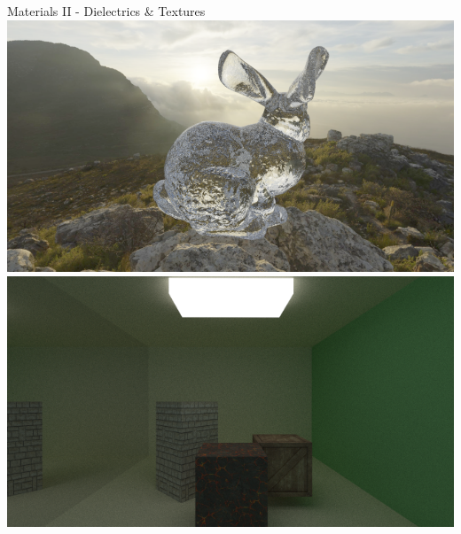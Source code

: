 \documentclass[xcolor=table]{beamer}
\begin{document}
\begin{frame}{Materials II - Dielectrics \& Textures}
   {
   \centering
   	\includegraphics[scale=0.185]{media/CapeHill_cristal_bunny_2.png}
   }
   {
   	\includegraphics[scale=0.25]{media/cornell_textures.png}
   }

\end{frame}
\end{document}
